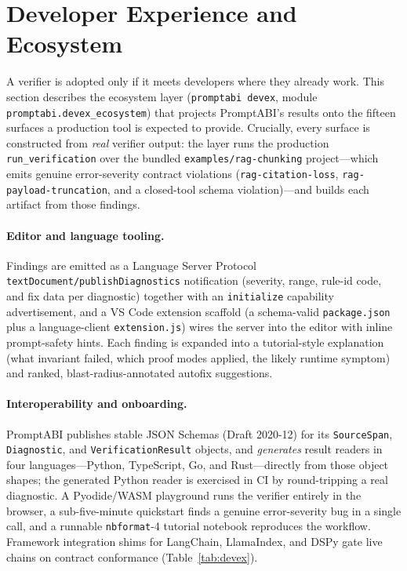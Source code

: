 \documentclass[10pt]{article}
\begin{document}
\section{Developer Experience and Ecosystem}
\label{sec:devex}

A verifier is adopted only if it meets developers where they already work. This
section describes the ecosystem layer (\texttt{promptabi devex}, module
\texttt{promptabi.devex\_ecosystem}) that projects PromptABI's results onto the
fifteen surfaces a production tool is expected to provide. Crucially, every
surface is constructed from \emph{real} verifier output: the layer runs the
production \texttt{run\_verification} over the bundled \texttt{examples/rag-chunk\-ing}
project---which emits genuine error-severity contract violations
(\texttt{rag-citation-loss}, \texttt{rag-payload-truncation}, and a closed-tool
schema violation)---and builds each artifact from those findings.

\paragraph{Editor and language tooling.}
Findings are emitted as a Language Server Protocol
\texttt{textDocument/publishDiagnostics} notification (severity, range, rule-id
code, and fix data per diagnostic) together with an \texttt{initialize} capability
advertisement, and a VS Code extension scaffold (a schema-valid
\texttt{package.json} plus a language-client \texttt{extension.js}) wires the
server into the editor with inline prompt-safety hints. Each finding is expanded
into a tutorial-style explanation (what invariant failed, which proof modes
applied, the likely runtime symptom) and ranked, blast-radius-annotated autofix
suggestions.

\paragraph{Interoperability and onboarding.}
PromptABI publishes stable JSON Schemas (Draft 2020-12) for its
\texttt{SourceSpan}, \texttt{Diagnostic}, and \texttt{VerificationResult} objects,
and \emph{generates} result readers in four languages---Python, TypeScript, Go,
and Rust---directly from those object shapes; the generated Python reader is
exercised in CI by round-tripping a real diagnostic. A Pyodide/WASM playground
runs the verifier entirely in the browser, a sub-five-minute quickstart finds a
genuine error-severity bug in a single call, and a runnable \texttt{nbformat}-4
tutorial notebook reproduces the workflow. Framework integration shims for
LangChain, LlamaIndex, and DSPy gate live chains on contract conformance
(Table~\ref{tab:devex}).
\end{document}
